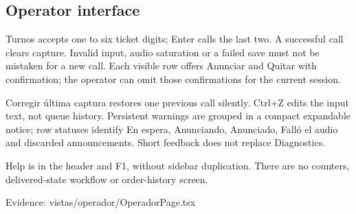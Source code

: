 \subsection{Operator interface}

Turnos accepts one to six ticket digits; Enter calls the last two. A successful call clears capture. Invalid input, audio saturation or a failed save must not be mistaken for a new call. Each visible row offers Anunciar and Quitar with confirmation; the operator can omit those confirmations for the current session.

Corregir última captura restores one previous call silently. Ctrl+Z edits the input text, not queue history. Persistent warnings are grouped in a compact expandable notice; row statuses identify En espera, Anunciando, Anunciado, Falló el audio and discarded announcements. Short feedback does not replace Diagnostics.

Help is in the header and F1, without sidebar duplication. There are no counters, delivered-state workflow or order-history screen.

Evidence: vistas/operador/OperadorPage.tsx
